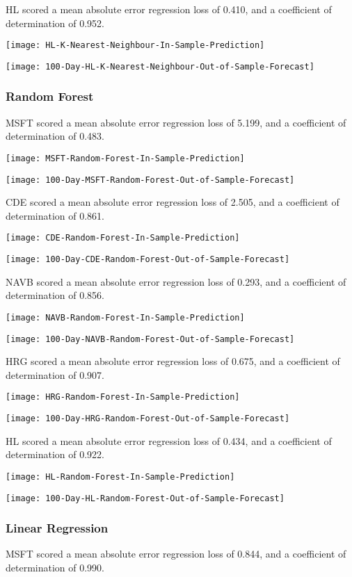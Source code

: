 HL scored a mean absolute error regression loss of 0.410, and a coefficient of determination of 0.952.

\texttt{[image: HL-K-Nearest-Neighbour-In-Sample-Prediction]}

\texttt{[image: 100-Day-HL-K-Nearest-Neighbour-Out-of-Sample-Forecast]}

\subsubsection{Random Forest}
MSFT scored a mean absolute error regression loss of 5.199, and a coefficient of determination of 0.483.

\texttt{[image: MSFT-Random-Forest-In-Sample-Prediction]}

\texttt{[image: 100-Day-MSFT-Random-Forest-Out-of-Sample-Forecast]}

CDE scored a mean absolute error regression loss of 2.505, and a coefficient of determination of 0.861.

\texttt{[image: CDE-Random-Forest-In-Sample-Prediction]}

\texttt{[image: 100-Day-CDE-Random-Forest-Out-of-Sample-Forecast]}

NAVB scored a mean absolute error regression loss of 0.293, and a coefficient of determination of 0.856.

\texttt{[image: NAVB-Random-Forest-In-Sample-Prediction]}

\texttt{[image: 100-Day-NAVB-Random-Forest-Out-of-Sample-Forecast]}

HRG scored a mean absolute error regression loss of 0.675, and a coefficient of determination of 0.907.

\texttt{[image: HRG-Random-Forest-In-Sample-Prediction]}

\texttt{[image: 100-Day-HRG-Random-Forest-Out-of-Sample-Forecast]}

HL scored a mean absolute error regression loss of 0.434, and a coefficient of determination of 0.922.

\texttt{[image: HL-Random-Forest-In-Sample-Prediction]}

\texttt{[image: 100-Day-HL-Random-Forest-Out-of-Sample-Forecast]}

\subsubsection{Linear Regression}
MSFT scored a mean absolute error regression loss of 0.844, and a coefficient of determination of 0.990.

